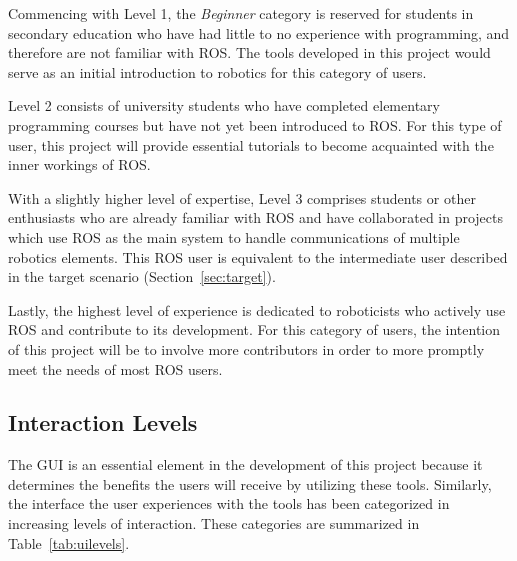         Commencing with Level 1, the \textit{Beginner} category is reserved for
        students in secondary education who have had little to no experience with
        programming, and therefore are not familiar with \ac{ROS}. The tools
        developed in this project would serve as an initial introduction to 
        robotics for this category of users.

        Level 2 consists of university students who have completed elementary 
        programming courses but have not yet been introduced to \ac{ROS}. For this
        type of user, this project will provide essential tutorials to become
        acquainted with the inner workings of \ac{ROS}.

        With a slightly higher level of expertise, Level 3 comprises students or
        other enthusiasts who are already familiar with \ac{ROS} and have collaborated
        in projects which use \ac{ROS} as the main system to handle communications
        of multiple robotics elements. This ROS user is equivalent to the intermediate
        user described in the target scenario (Section~\ref{sec:target}).

        Lastly, the highest level of experience is dedicated to roboticists who
        actively use \ac{ROS} and contribute to its development. For this 
        category of users, the intention of this project will be to involve more
        contributors in order to more promptly meet the needs of most \ac{ROS} users.


    \subsection{Interaction Levels}

        The \ac{GUI} is an essential element in the development of this project
        because it determines the benefits the users will receive by utilizing 
        these tools. Similarly, the interface the user experiences with the tools
        has been categorized in increasing levels of interaction. These categories
        are summarized in Table~\ref{tab:uilevels}.

